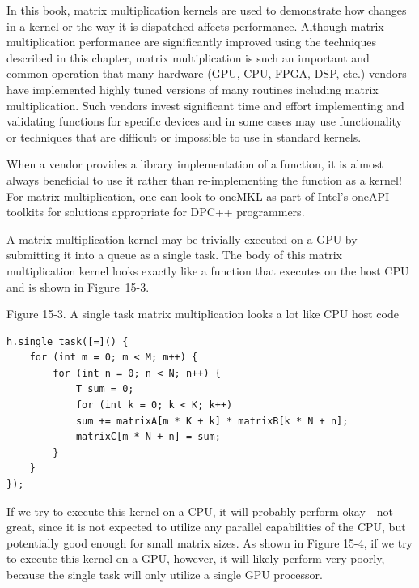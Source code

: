 \begin{tcolorbox}[colback=blue!5!white,colframe=blue!75!black, title=A REMINDER ABOUT MATRIX MULTIPLICATION]
In this book, matrix multiplication kernels are used to demonstrate how changes in a kernel or the way it is dispatched affects performance. Although matrix multiplication performance are significantly improved using the techniques described in this chapter, matrix multiplication is such an important and common operation that many hardware (GPU, CPU, FPGA, DSP, etc.) vendors have implemented highly tuned versions of many routines including matrix multiplication. Such vendors invest significant time and effort implementing and validating functions for specific devices and in some cases may use functionality or techniques that are difficult or impossible to use in standard kernels.
\end{tcolorbox}

\begin{tcolorbox}[colback=blue!5!white,colframe=blue!75!black, title=USE VENDOR-PROVIDED LIBRARIES!]
When a vendor provides a library implementation of a function, it is almost always beneficial to use it rather than re-implementing the function as a kernel! For matrix multiplication, one can look to oneMKL as part of Intel’s oneAPI toolkits for solutions appropriate for DPC++ programmers.
\end{tcolorbox}

A matrix multiplication kernel may be trivially executed on a GPU by submitting it into a queue as a single task. The body of this matrix multiplication kernel looks exactly like a function that executes on the host CPU and is shown in Figure 15-3.\par

\hspace*{\fill} \par %
Figure 15-3. A single task matrix multiplication looks a lot like CPU host code
\begin{lstlisting}[caption={}]
h.single_task([=]() {
	for (int m = 0; m < M; m++) {
		for (int n = 0; n < N; n++) {
			T sum = 0;
			for (int k = 0; k < K; k++)
			sum += matrixA[m * K + k] * matrixB[k * N + n];
			matrixC[m * N + n] = sum;
		}
	}
});
\end{lstlisting}

If we try to execute this kernel on a CPU, it will probably perform okay—not great, since it is not expected to utilize any parallel capabilities of the CPU, but potentially good enough for small matrix sizes. As shown in Figure 15-4, if we try to execute this kernel on a GPU, however, it will likely perform very poorly, because the single task will only utilize a single GPU processor.\par

